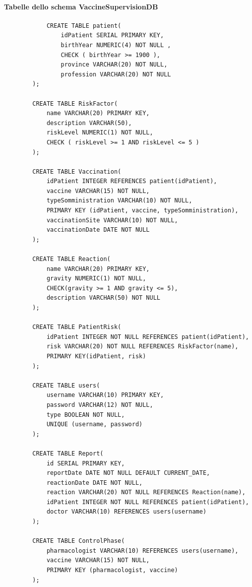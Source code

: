 \documentclass[11pt]{article}
\begin{document}
    \paragraph*{Tabelle dello schema VaccineSupervisionDB}
        \begin{verbatim}
            CREATE TABLE patient(
                idPatient SERIAL PRIMARY KEY,
                birthYear NUMERIC(4) NOT NULL ,
                CHECK ( birthYear >= 1900 ),
                province VARCHAR(20) NOT NULL,
                profession VARCHAR(20) NOT NULL
        );
        
        CREATE TABLE RiskFactor(
            name VARCHAR(20) PRIMARY KEY,
            description VARCHAR(50),
            riskLevel NUMERIC(1) NOT NULL,
            CHECK ( riskLevel >= 1 AND riskLevel <= 5 )
        );
        
        CREATE TABLE Vaccination(
            idPatient INTEGER REFERENCES patient(idPatient),
            vaccine VARCHAR(15) NOT NULL,
            typeSomministration VARCHAR(10) NOT NULL,
            PRIMARY KEY (idPatient, vaccine, typeSomministration),
            vaccinationSite VARCHAR(10) NOT NULL,
            vaccinationDate DATE NOT NULL
        );
        
        CREATE TABLE Reaction(
            name VARCHAR(20) PRIMARY KEY,
            gravity NUMERIC(1) NOT NULL,
            CHECK(gravity >= 1 AND gravity <= 5),
            description VARCHAR(50) NOT NULL
        );
        
        CREATE TABLE PatientRisk(
            idPatient INTEGER NOT NULL REFERENCES patient(idPatient),
            risk VARCHAR(20) NOT NULL REFERENCES RiskFactor(name),
            PRIMARY KEY(idPatient, risk)
        );
        
        CREATE TABLE users(
            username VARCHAR(10) PRIMARY KEY,
            password VARCHAR(12) NOT NULL,
            type BOOLEAN NOT NULL,
            UNIQUE (username, password)
        );
        
        CREATE TABLE Report(
            id SERIAL PRIMARY KEY,
            reportDate DATE NOT NULL DEFAULT CURRENT_DATE,
            reactionDate DATE NOT NULL,
            reaction VARCHAR(20) NOT NULL REFERENCES Reaction(name),
            idPatient INTEGER NOT NULL REFERENCES patient(idPatient),
            doctor VARCHAR(10) REFERENCES users(username)
        );
        
        CREATE TABLE ControlPhase(
            pharmacologist VARCHAR(10) REFERENCES users(username),
            vaccine VARCHAR(15) NOT NULL,
            PRIMARY KEY (pharmacologist, vaccine)
        );
        \end{verbatim}
    
\end{document}
